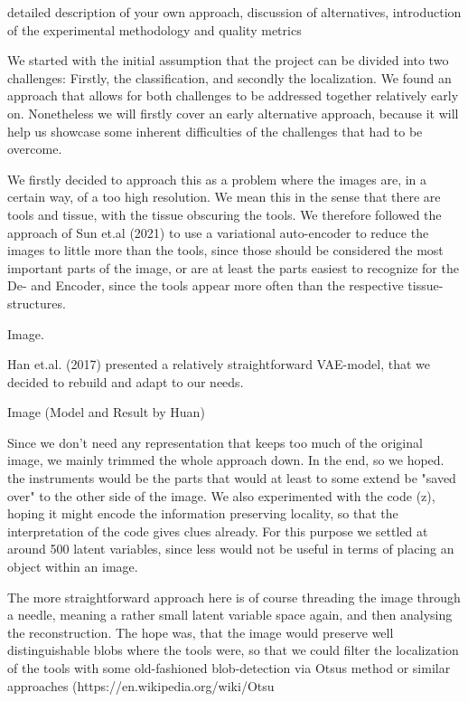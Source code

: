 detailed description of your own approach, discussion of alternatives, introduction of the experimental methodology and quality metrics


We started with the initial assumption that the project can be divided into two challenges: Firstly, the classification, and secondly the localization. We found an approach that allows for both challenges to be addressed together relatively early on. Nonetheless we will firstly cover an early alternative approach, because it will help us showcase some inherent difficulties of the challenges that had to be overcome.

We firstly decided to approach this as a problem where the images are, in a certain way, of a too high resolution. We mean this in the sense that there are tools and tissue, with the tissue obscuring the tools. We therefore followed the approach of Sun et.al (2021) to use a variational auto-encoder to reduce the images to little more than the tools, since those should be considered the most important parts of the image, or are at least the parts easiest to recognize for the De- and Encoder, since the tools appear more often than the respective tissue-structures.

Image.

Han et.al. (2017) presented a relatively straightforward VAE-model, that we decided to rebuild and adapt to our needs. 

Image (Model and Result by Huan)

Since we don't need any representation that keeps too much of the original image, we mainly trimmed the whole approach down.
In the end, so we hoped. the instruments would be the parts that would at least to some extend be "saved over" to the other side of the image. We also experimented with the code (z), hoping it might encode the information preserving locality, so that the interpretation of the code gives clues already. For this purpose we settled at around 500 latent variables, since less would not be useful in terms of placing an object within an image. 

The more straightforward approach here is of course threading the image through a needle, meaning a rather small latent variable space again, and then analysing the reconstruction. The hope was, that the image would preserve well distinguishable blobs where the tools were, so that we could filter the localization of the tools with some old-fashioned blob-detection via Otsus method or similar approaches (https://en.wikipedia.org/wiki/Otsu%

